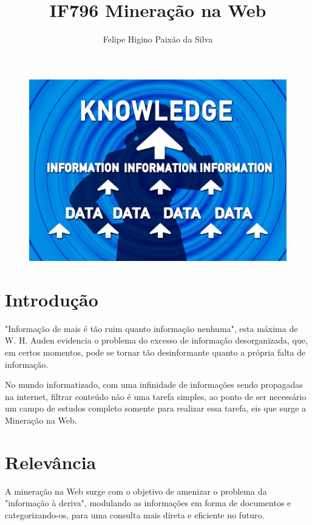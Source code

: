 \documentclass[a4paper,10pt]{article}
\title{IF796 Mineração na Web}
\author{Felipe Higino Paixão da Silva }
\begin{document}
\maketitle

\begin{figure}[h!]
    \centering
    \includegraphics[scale = 0.2]{datato.jpg}
    \caption{\cite{img1}}
    \label{fig:my_label}
\end{figure}


\section{Introdução}
"Informação de mais é tão ruim quanto informação nenhuma", esta máxima de W. H. Auden evidencia o problema do excesso de informação desorganizada, que, em certos momentos, pode se tornar tão desinformante quanto a própria falta de informação.

No mundo informatizado, com uma infinidade de informações sendo propagadas na internet, filtrar conteúdo não é uma tarefa simples, ao ponto de ser necessário um campo de estudos completo somente para realizar essa tarefa, eis que surge a Mineração na Web.

\section{Relevância}
A mineração na Web surge com o objetivo de amenizar o problema da "informação à deriva", modulando as informações em forma de documentos e categorizando-os, para uma consulta mais direta e eficiente no futuro.
\end{document}
